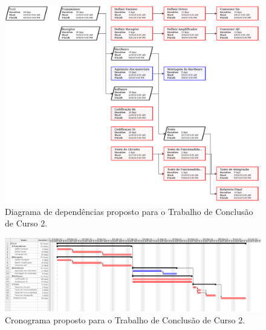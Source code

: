 \begin{apendicesenv}
\begin{figure}
	\centering
		\includegraphics[width = 18cm]{figuras/Network_diagram.png}
	\caption{Diagrama de dependências proposto para o Trabalho de Conclusão de Curso 2.}
	\label{Fig: Network_diagram}
\end{figure}

\begin{figure}
	\centering
		\includegraphics[width = 25cm, angle = 90]{figuras/Grantt_diagram.png}
	\caption{Cronograma proposto para o Trabalho de Conclusão de Curso 2.}
	\label{Fig: Grantt_diagram}
\end{figure}

\end{apendicesenv}
